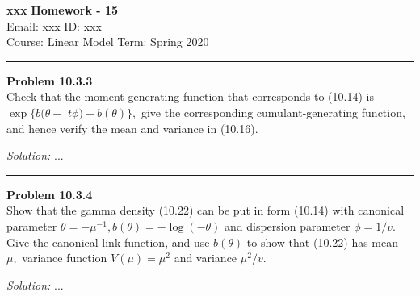 \documentclass[a4paper, 11pt]{article}
\newenvironment{problem}[2][Problem]
    { \begin{mdframed}[backgroundcolor=gray!20] \textbf{#1 #2} \\}
    {  \end{mdframed}}
\newenvironment{solution}
    {\textit{Solution:}}
    {}
\begin{document}
\noindent
\large\textbf{xxx} \hfill \textbf{Homework - 15}   \\
Email: xxx \hfill ID: xxx \\
\normalsize Course: Linear Model   \hfill Term: Spring 2020\\
\noindent\rule{7in}{2.8pt}


\begin{problem}{10.3.3}
Check that the moment-generating function that corresponds to (10.14) is $\exp \{b(\theta+$ $t \phi)-b(\theta)\},$ give the corresponding cumulant-generating function, and hence verify the mean and variance in (10.16).
\end{problem}
\begin{solution}
...
\end{solution}

\noindent\rule{7in}{2.8pt}

\begin{problem}{10.3.4}
Show that the gamma density (10.22) can be put in form (10.14) with canonical parameter $\theta=-\mu^{-1}, b(\theta)=-\log (-\theta)$ and dispersion parameter $\phi=1 / v .$ Give the canonical link function, and use $b(\theta)$ to show that (10.22) has mean $\mu,$ variance function $V(\mu)=\mu^{2}$ and variance $\mu^{2} / v$.
\end{problem}
\begin{solution}
...
\end{solution}
\end{document}
